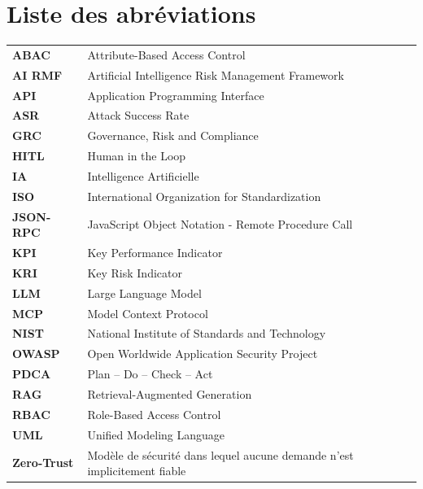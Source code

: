 \documentclass[12pt,a4paper,oneside]{report}
\begin{document}
\chapter*{Liste des abréviations}
\begin{longtable}{p{3cm} p{10.5cm}}
\textbf{ABAC} & Attribute-Based Access Control \\
\textbf{AI RMF} & Artificial Intelligence Risk Management Framework \\
\textbf{API} & Application Programming Interface \\
\textbf{ASR} & Attack Success Rate \\
\textbf{GRC} & Governance, Risk and Compliance \\
\textbf{HITL} & Human in the Loop \\
\textbf{IA} & Intelligence Artificielle \\
\textbf{ISO} & International Organization for Standardization \\
\textbf{JSON-RPC} & JavaScript Object Notation - Remote Procedure Call \\
\textbf{KPI} & Key Performance Indicator \\
\textbf{KRI} & Key Risk Indicator \\
\textbf{LLM} & Large Language Model \\
\textbf{MCP} & Model Context Protocol \\
\textbf{NIST} & National Institute of Standards and Technology \\
\textbf{OWASP} & Open Worldwide Application Security Project \\
\textbf{PDCA} & Plan -- Do -- Check -- Act \\
\textbf{RAG} & Retrieval-Augmented Generation \\
\textbf{RBAC} & Role-Based Access Control \\
\textbf{UML} & Unified Modeling Language \\
\textbf{Zero-Trust} & Modèle de sécurité dans lequel aucune demande n'est implicitement fiable \\
\end{longtable}

\clearpage
{}









\end{document}
